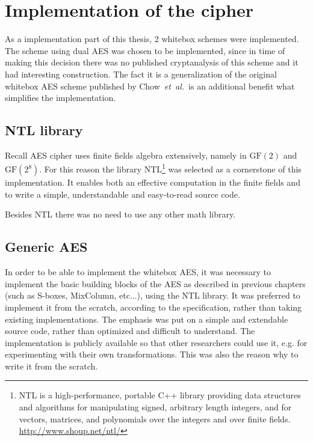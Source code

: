\documentclass[11pt,oneside,final]{fithesis2}
\newcommand{\gfe}{\ensuremath{\text{GF}\left(2^8\right)}}
\newcommand{\gf}{\ensuremath{\text{GF}\left(2\right)}}
\newcommand{\eal}{\emph{et~al.}}
\begin{document}
    \section{Implementation of the cipher}
    As a implementation part of this thesis, 2 whitebox schemes were implemented.
    The scheme using dual AES was chosen to be implemented, since in time of making this decision there was no published cryptanalysis
    of this scheme and it had interesting construction. The fact it is a generalization of the original whitebox AES scheme
    published by Chow~\eal\ is an additional benefit what simplifies the implementation.
    
    \subsection{NTL library}
    Recall AES cipher uses finite fields algebra extensively, namely in $\gf$ and $\gfe$. For this reason the library
    NTL\footnote{NTL is a high-performance, portable C++ library providing data structures and algorithms for manipulating signed, arbitrary length integers, 
	and for vectors, matrices, and polynomials over the integers and over finite fields. \url{http://www.shoup.net/ntl/}} was selected
    as a cornerstone of this implementation. It enables both an effective computation in the finite fields and to write a simple, understandable and easy-to-read
    source code. 
    
    Besides NTL there was no need to use any other math library.
    
    \subsection{Generic AES}
    In order to be able to implement the whitebox AES, it was necessary to implement the basic building blocks of the AES as described in
    previous chapters (such as S-boxes, MixColumn, etc...), using the NTL library. It was preferred to implement it from the scratch, according to the specification,
    rather than taking existing implementations. The emphasis was put on a simple and extendable source code, rather than optimized and difficult to understand.
    The implementation is publicly available so that other researchers could use it, e.g. for experimenting with their own transformations. This was also 
    the reason why to write it from the scratch.
 
\end{document}
